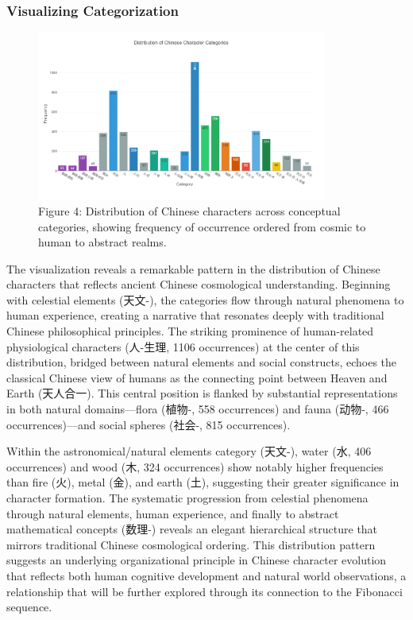 \documentclass[
  11pt,
  letterpaper,
]{article}
\begin{document}
\subsubsection{Visualizing
Categorization}\label{visualizing-categorization}

\begin{figure}
\centering
\includegraphics[width=0.85\textwidth]{./images/zi_category_histogram.png}
\caption{Figure 4: Distribution of Chinese characters across conceptual
categories, showing frequency of occurrence ordered from cosmic to human
to abstract realms.}
\end{figure}



The visualization reveals a remarkable pattern in the distribution of
Chinese characters that reflects ancient Chinese cosmological
understanding. Beginning with celestial elements (天文-), the categories
flow through natural phenomena to human experience, creating a narrative
that resonates deeply with traditional Chinese philosophical principles.
The striking prominence of human-related physiological characters
(人-生理, 1106 occurrences) at the center of this distribution, bridged
between natural elements and social constructs, echoes the classical
Chinese view of humans as the connecting point between Heaven and Earth
(天人合一). This central position is flanked by substantial
representations in both natural domains---flora (植物-, 558 occurrences)
and fauna (动物-, 466 occurrences)---and social spheres (社会-, 815
occurrences).

Within the astronomical/natural elements category (天文-), water (水,
406 occurrences) and wood (木, 324 occurrences) show notably higher
frequencies than fire (火), metal (金), and earth (土), suggesting their
greater significance in character formation. The systematic progression
from celestial phenomena through natural elements, human experience, and
finally to abstract mathematical concepts (数理-) reveals an elegant
hierarchical structure that mirrors traditional Chinese cosmological
ordering. This distribution pattern suggests an underlying
organizational principle in Chinese character evolution that reflects
both human cognitive development and natural world observations, a
relationship that will be further explored through its connection to the
Fibonacci sequence.
\end{document}

